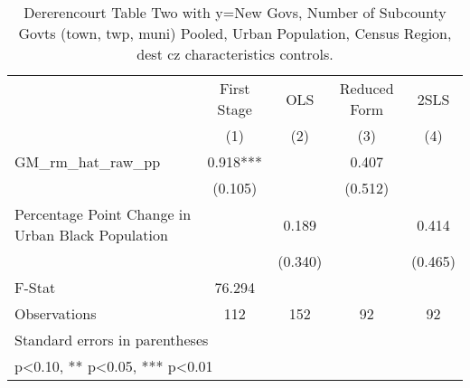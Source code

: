 \begin{table}[htbp]\centering
\def\sym#1{\ifmmode^{#1}\else\(^{#1}\)\fi}
\caption{Dererencourt Table Two with y=New Govs, Number of Subcounty Govts (town, twp, muni)  Pooled, Urban Population, Census Region, dest cz characteristics controls.}
\begin{tabular}{l*{4}{c}}
\toprule
                    & First Stage   &         OLS   &Reduced Form   &        2SLS   \\
                    &\multicolumn{1}{c}{(1)}   &\multicolumn{1}{c}{(2)}   &\multicolumn{1}{c}{(3)}   &\multicolumn{1}{c}{(4)}   \\
\midrule
GM\_rm\_hat\_raw\_pp    &       0.918***&               &       0.407   &               \\
                    &     (0.105)   &               &     (0.512)   &               \\
\addlinespace
Percentage Point Change in Urban Black Population&               &       0.189   &               &       0.414   \\
                    &               &     (0.340)   &               &     (0.465)   \\
\midrule
F-Stat              &      76.294   &               &               &               \\
Observations        &         112   &         152   &          92   &          92   \\
\bottomrule
\multicolumn{5}{l}{\footnotesize Standard errors in parentheses}\\
\multicolumn{5}{l}{\footnotesize * p<0.10, ** p<0.05, *** p<0.01}\\
\end{tabular}
\end{table}
